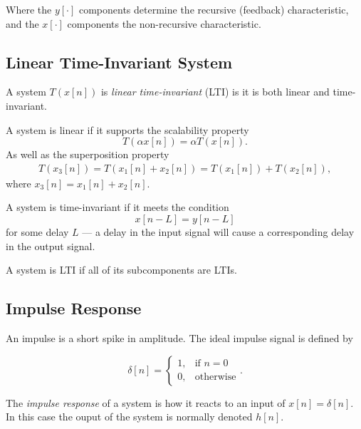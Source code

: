 \documentclass{article}
\def\lsqb{\left[}
\def\rsqb{\right]}
\def\sqb#1{\lsqb #1 \rsqb}
\def\xsig{x\sqb{n}}
\begin{document}
Where the $y\sqb{\cdot}$ components determine the recursive (feedback) characteristic, and the $x\sqb{\cdot}$ components the non-recursive characteristic.

\subsection{Linear Time-Invariant System}

A system $T(x\sqb{n})$ is \textit{linear time-invariant} (LTI) is it is both linear and time-invariant.

A system is linear if it supports the scalability property 
\begin{equation}
    T(\alpha \xsig) = \alpha T(\xsig).
\end{equation}
As well as the superposition property 
\begin{gather}
    T(x_3\sqb{n}) = T(x_1\sqb{n} + x_2\sqb{n}) =  T(x_1\sqb{n}) + T(x_2\sqb{n}), 
\end{gather}
where $x_3\sqb{n} = x_1\sqb{n} + x_2\sqb{n}$.

A system is time-invariant if it meets the condition
\begin{equation}
    x\sqb{n - L} = y\sqb{n - L}
\end{equation}
for some delay $L$ --- a delay in the input signal will cause a corresponding delay in the output signal.

A system is LTI if all of its subcomponents are LTIs.

\subsection{Impulse Response}
An impulse is a short spike in amplitude. The ideal impulse signal is defined by

\begin{equation}
    \delta\sqb{n} =
        \begin{cases}
            1, & \text{if } n = 0 \\
            0, & \text{otherwise}
        \end{cases}.
\end{equation}

The \textit{impulse response} of a system is how it reacts to an input of $\xsig = \delta\sqb{n}$. In this
case the ouput of the system is normally denoted $h\sqb{n}$.
\end{document}
